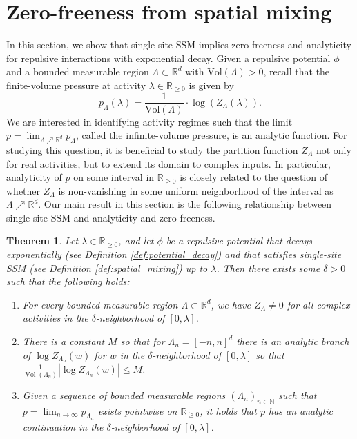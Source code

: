 \documentclass[10pt]{amsart}
\newtheorem{theorem}{Theorem}[section]
\theoremstyle{definition}
\theoremstyle{remark}
\newcommand{\Vol}{\operatorname{Vol}}
\newcommand{\N}{\mathbb{N}}
\newcommand{\R}{\mathbb{R}}
\newcommand{\region}{\Lambda}
\newcommand{\potential}{\phi}
\newcommand{\activity}{\lambda}
\newcommand{\vol}{\mathrm{Vol}}
\begin{document}
	\section{Zero-freeness from spatial mixing}\label{sec:zero-free}
	In this section, we show that single-site SSM implies zero-freeness and analyticity for repulsive interactions with exponential decay.
	Given a repulsive potential $\potential$ and a bounded measurable region $\region \subset \R^d$ with $\vol(\region) > 0$, recall that the finite-volume pressure at activity $\activity \in \R_{\ge 0}$ is given by
	\[
	p_{\region}(\activity) = \frac{1}{\vol(\region)} \cdot \log(Z_{\region}(\activity)) .
	\]
	We are interested in identifying activity regimes such that the limit $p = \lim_{\region \nearrow \R^d} p_{\region}$, called the infinite-volume pressure, is an analytic function. 
	For studying this question, it is beneficial to study the partition function $Z_{\region}$ not only for real activities, but to extend its domain to complex inputs.
	In particular, analyticity of $p$ on some interval in $\R_{\ge 0}$ is closely related to the question of whether $Z_{\region}$ is non-vanishing in some uniform neighborhood of the interval as $\region \nearrow \R^d$.
	Our main result in this section is the following relationship between single-site SSM and analyticity and zero-freeness.
	\begin{theorem}\label{thm:zero_freeness}
		Let $\activity \in \R_{\ge 0}$, and let $\potential$ be a repulsive potential that decays exponentially (see Definition \ref{def:potential_decay}) and that satisfies single-site SSM (see Definition \ref{def:spatial_mixing}) up to $\activity$.
		Then there exists some $\delta > 0$ such that the following holds:
		\begin{enumerate}[(1)]
			\item\label{thm:zero_freeness:roots} For every bounded measurable region $\region \subset \R^d$, we have $Z_{\region} \neq 0$ for all complex activities in the $\delta$-neighborhood of $[0, \activity]$.
			
			\item\label{thm:zero_freeness:log-bound} There is a constant $M$ so that for $\Lambda_n = [-n,n]^d$ there is an analytic branch of $\log Z_{\Lambda_n}(w)$ for $w$ in the $\delta$-neighborhood of $[0,\lambda]$ so that $\frac{1}{\Vol(\Lambda_n)}|\log Z_{\Lambda_n}(w)| \leq M$.
			
			
			\item\label{thm:zero_freeness:analyticity} Given a sequence of bounded measurable regions $(\region_n)_{n \in \N}$ such that $p = \lim_{n \to \infty} p_{\region_n}$ exists pointwise on $\R_{\ge 0}$, it holds that $p$ has an analytic continuation in the $\delta$-neighborhood of $[0, \activity]$.
		\end{enumerate}
	\end{theorem}
	
\end{document}
